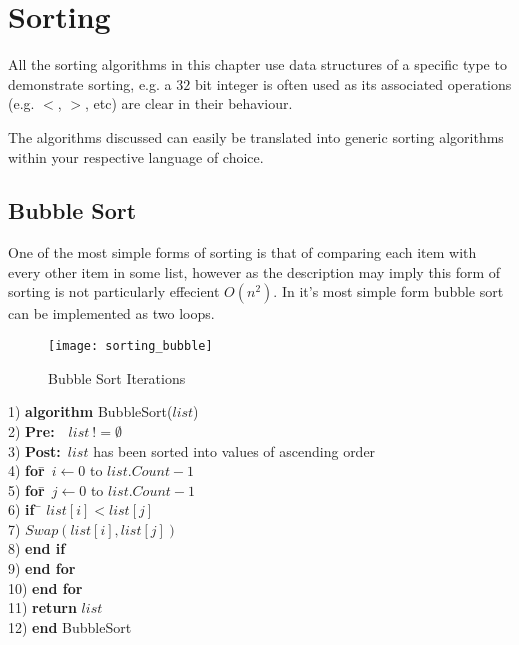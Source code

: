 \chapter{Sorting}
All the sorting algorithms in this chapter use data structures of a specific type to demonstrate sorting, e.g. a $32$ bit integer is often used as its associated operations (e.g. $<$, $>$, etc) are clear in their behaviour.

The algorithms discussed can easily be translated into generic sorting algorithms within your respective language of choice.
\newpage
\section{Bubble Sort}
One of the most simple forms of sorting is that of comparing each item with every other item in some list, however as the description may imply this form of sorting is not particularly effecient $O(n^{2})$. In it's most simple form bubble sort can be implemented as two loops.

\begin{figure}[h]
\begin{center}
\texttt{[image: sorting\_bubble]}
\end{center}
\caption{Bubble Sort Iterations} \label{fig:sorting_bubble}
\end{figure}

\begin{tabbing}
1)  \textbf{alg}\= \textbf{orithm} BubbleSort($list$) \\
2)  \> \textbf{Pre:}~~$list~!= \emptyset$ \\
3)  \> \textbf{Post:}~$list$ has been sorted into values of ascending order \\
4)  \> \textbf{for}\=~$i \leftarrow 0$ to $list.Count - 1$ \\
5)  \> \> \textbf{for}\=~$j \leftarrow 0$ to $list.Count - 1$ \\
6)  \> \> \> \textbf{if}~\= $list[i] < list[j]$ \\
7)  \> \> \> \> $Swap(list[i], list[j])$ \\
8)  \> \> \> \textbf{end if} \\
9)  \> \> \textbf{end for} \\
10) \> \textbf{end for} \\
11) \> \textbf{return} $list$ \\
12) \textbf{end} BubbleSort
\end{tabbing}

